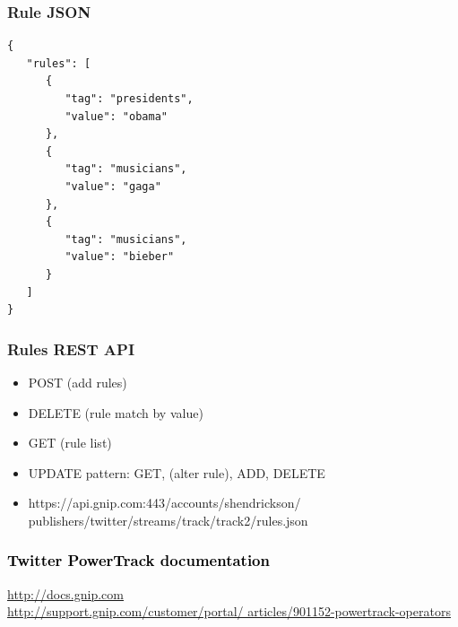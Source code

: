 \documentclass{beamer}
\begin{document}

\begin{frame}[fragile]\frametitle{Rule JSON}
\begin{verbatim}
{
   "rules": [
      {
         "tag": "presidents", 
         "value": "obama"
      }, 
      {
         "tag": "musicians", 
         "value": "gaga"
      }, 
      {
         "tag": "musicians", 
         "value": "bieber"
      }
   ]
} 
\end{verbatim}
\end{frame}

\begin{frame}\frametitle{Rules REST API}
\begin{itemize}
\item POST (add rules)
\item DELETE (rule match by value)
\item GET (rule list)
\item UPDATE pattern: GET, (alter rule), ADD, DELETE
\item https://api.gnip.com:443/accounts/shendrickson/\\
    publishers/twitter/streams/track/track2/rules.json
\end{itemize}
\end{frame}

{
\begin{frame}\frametitle{\textcolor{black} {Twitter PowerTrack documentation}}
  \begin{center}
\textcolor{black} {
\Large \href{http://docs.gnip.com/}{http://docs.gnip.com} \\ [20 pt]
\href{http://support.gnip.com/customer/portal/articles/901152-powertrack-operators}{http://support.gnip.com/customer/portal/ articles/901152-powertrack-operators} }
  \end{center}
\end{frame}
}
\end{document}
